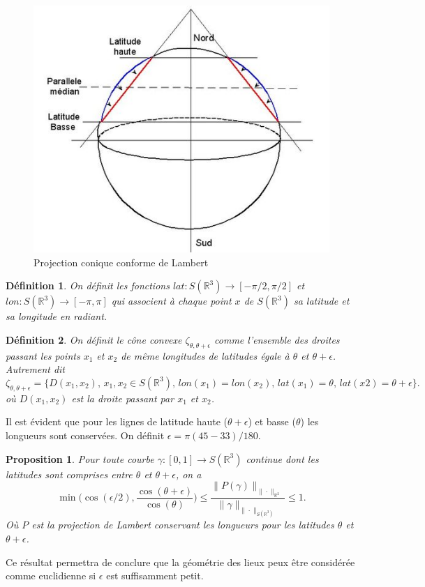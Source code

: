 \documentclass[a4paper,11pt]{article}
\numberwithin{equation}{section}
\newtheorem{proposition}{Proposition}
\newtheorem{definition}{Définition}
\begin{document}
\begin{figure}[H]
	\label{fig-proj Lambert}
	\begin{center}
	\includegraphics[scale=0.6]{lambert.jpg}
	\end{center}
\caption{Projection conique conforme de Lambert}
\end{figure}
\begin{definition}
	On définit les fonctions $lat:S(\mathbb{R}^3)\to [-\pi/2,\pi/2] $ et $lon:S(\mathbb{R}^3) \to [-\pi,\pi] $ qui associent à chaque point $x$ de $S(\mathbb{R}^3)$ sa latitude et sa longitude en radiant.
\end{definition} 
\begin{definition}
	On définit le cône convexe $\zeta_{\theta,\theta+\epsilon}$ comme l'ensemble des droites passant les points $x_1$ et $x_2$ de même longitudes de latitudes égale à $\theta$ et $\theta+\epsilon$. Autrement dit
	\[\zeta_{\theta,\theta+\epsilon}=\{D(x_1,x_2), \, x_1,x_2 \in S(\mathbb{R}^3), \, lon(x_1)=lon(x_2),\, lat(x_1)=\theta,\, lat(x2)=\theta+\epsilon\}.\] 
	où $D(x_1,x_2)$ est la droite passant par $x_1$ et $x_2$.
\end{definition}


Il est évident que pour les lignes de latitude haute ($\theta+ \epsilon$) et basse ($\theta$) les longueurs sont conservées. On définit $\epsilon=\pi (45-33)/180$. 


\begin{proposition}
	Pour toute courbe $\gamma: [0,1] \to S(\mathbb{R}^3)$ continue dont les latitudes sont comprises entre $\theta$ et $\theta+\epsilon$, on a 
	\[\min\Big(\cos(\epsilon/2),\frac{\cos(\theta+\epsilon)}{\cos(\theta)} \Big)\leq \frac{\|P(\gamma)\|_{\|\cdot\|_{\mathbb{R}^2}}}{\|\gamma\|_{\|\cdot\|_{S(\mathbb{R}^3)}}} \leq 1.\]
	Où $P$ est la projection de Lambert conservant les longueurs pour les latitudes $\theta$ et $\theta+\epsilon$.
\end{proposition} 
Ce résultat permettra de conclure que la géométrie des lieux peux être considérée comme euclidienne si $\epsilon$ est suffisamment petit.
\end{document}
